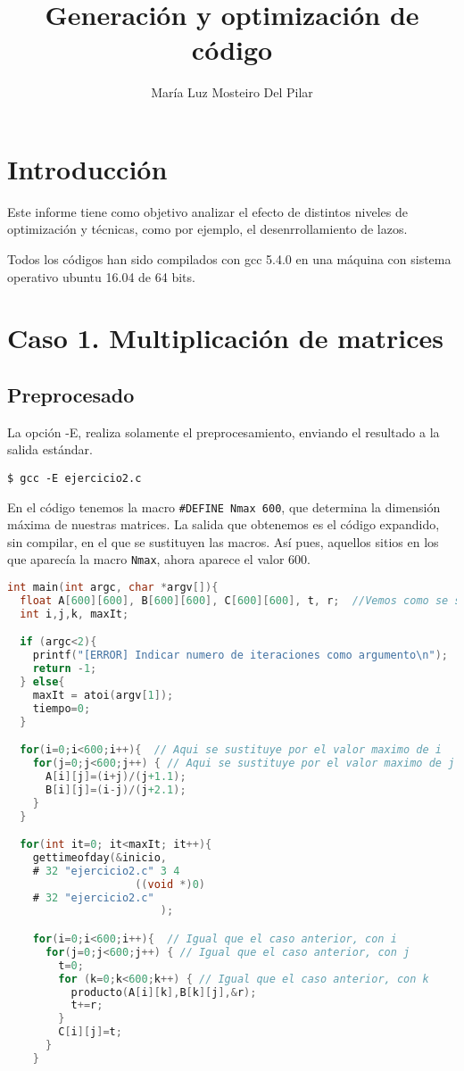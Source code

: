 \documentclass[10pt,a4paper]{article}
\author{María Luz Mosteiro Del Pilar}
\title{Generación y optimización de código}
\begin{document}
\maketitle
\tableofcontents
\section{Introducción}
Este informe tiene como objetivo analizar el efecto de distintos niveles de optimización y técnicas, como por ejemplo, el desenrrollamiento de lazos. 

Todos los códigos han sido compilados con gcc 5.4.0 en una máquina con sistema operativo ubuntu 16.04 de 64 bits. 

\section{Caso 1. Multiplicación de matrices}

\subsection{Preprocesado}
La opción -E, realiza solamente el preprocesamiento, enviando el resultado a la salida estándar.
\begin{lstlisting}[style=consola, numbers=none]
$ gcc -E ejercicio2.c
\end{lstlisting}
En el código tenemos la macro \texttt{\#DEFINE Nmax 600}, que determina la dimensión máxima de nuestras matrices. La salida que obtenemos es el código expandido, sin compilar, en el que se sustituyen las macros. Así pues, aquellos sitios en los que aparecía la macro \texttt{Nmax}, ahora aparece el valor 600.
\begin{lstlisting}[language=C]
int main(int argc, char *argv[]){
  float A[600][600], B[600][600], C[600][600], t, r;  //Vemos como se sustituye el tamano del array
  int i,j,k, maxIt;

  if (argc<2){
    printf("[ERROR] Indicar numero de iteraciones como argumento\n");
    return -1;
  } else{  
    maxIt = atoi(argv[1]);
    tiempo=0;
  }

  for(i=0;i<600;i++){  // Aqui se sustituye por el valor maximo de i
    for(j=0;j<600;j++) { // Aqui se sustituye por el valor maximo de j
      A[i][j]=(i+j)/(j+1.1);
      B[i][j]=(i-j)/(j+2.1);
    }
  }

  for(int it=0; it<maxIt; it++){
    gettimeofday(&inicio,
    # 32 "ejercicio2.c" 3 4
                    ((void *)0)
    # 32 "ejercicio2.c"
                        );

    for(i=0;i<600;i++){  // Igual que el caso anterior, con i
      for(j=0;j<600;j++) { // Igual que el caso anterior, con j
        t=0;
        for (k=0;k<600;k++) { // Igual que el caso anterior, con k
          producto(A[i][k],B[k][j],&r);
          t+=r;
        }
        C[i][j]=t;
      }
    }
\end{lstlisting}
\end{document}
